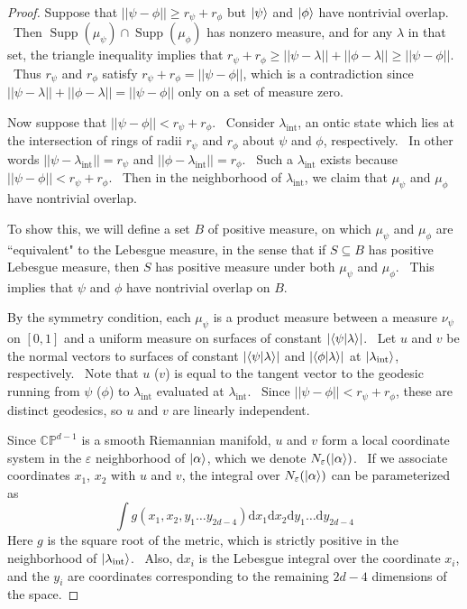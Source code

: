 \documentclass[letterpaper,11pt]{article}
\newcommand{\braket}[2]{\mbox{$ \langle #1 | #2 \rangle $}}
\newcommand{\ket}[1]{\mbox{$ | #1 \rangle $}}
\DeclareMathOperator{\supp}{Supp}
\begin{document}
\begin{proof}
Suppose that $||\psi-\phi||\geq r_{\psi}+r_{\phi}$ but $\ket{\psi}$ and $\ket{\phi}$ have nontrivial overlap. \ Then $\supp(\mu_{\psi})\cap \supp(\mu_{\phi})$ has nonzero measure, and for any $\lambda$ in that set, the triangle inequality implies that $r_{\psi}+r_{\phi}\geq ||\psi-\lambda||+||\phi-\lambda|| \geq ||\psi-\phi||$. \
Thus $r_{\psi}$ and $r_{\phi}$ satisfy $r_{\psi}+r_{\phi} = ||\psi-\phi||$, which is a contradiction since $||\psi-\lambda|| + ||\phi-\lambda|| = ||\psi-\phi||$ only on a set of measure zero. \

Now suppose that $||\psi-\phi||< r_{\psi}+r_{\phi}$. \ Consider $\lambda_{\mathrm{int}}$, an ontic state which lies at the intersection of rings of radii $r_{\psi}$ and $r_{\phi}$ about $\psi$ and $\phi$, respectively. \ In other words $||\psi-\lambda_{\mathrm{int}}|| =r_{\psi} $ and $||\phi-\lambda_{\mathrm{int}}|| =r_{\phi}$. \ Such a $\lambda_{\mathrm{int}}$ exists because $||\psi-\phi||< r_{\psi}+r_{\phi}$. \ Then in the neighborhood of $\lambda_{\mathrm{int}}$, we claim that $\mu_{\psi}$ and $\mu_{\phi}$ have nontrivial overlap.


To show this, we will define a set $B$ of positive measure, on which $\mu_{\psi}$ and $\mu_{\phi}$ are ``equivalent" to the Lebesgue measure, in the sense that if $S\subseteq B$ has positive Lebesgue measure, then $S$ has positive measure under both $\mu_{\psi}$ and $\mu_{\phi}$. \ This implies that $\psi$ and $\phi$ have nontrivial overlap on $B$.

By the symmetry condition, each $\mu_{\psi}$ is a product measure between a measure $\nu_{\psi}$ on $[0,1]$ and a uniform measure on surfaces of constant $|\braket{\psi}{\lambda}|$. \ Let $u$ and $v$ be the normal vectors to surfaces of constant $|\braket{\psi}{\lambda}|$ and $|\braket{\phi}{\lambda}|$ at $\ket{\lambda_{\mathrm{int}}}$, respectively. \ Note that $u$ ($v$) is equal to the tangent vector to the geodesic running from $\psi$ ($\phi$) to $\lambda_{\mathrm{int}}$ evaluated at $\lambda_{\mathrm{int}}$. \ Since $||\psi-\phi||< r_{\psi}+r_{\phi}$, these are distinct geodesics, so $u$ and $v$ are linearly independent.

Since $\mathbb{CP}^{d-1}$ is a smooth Riemannian manifold, $u$ and $v$ form a local coordinate system in the $\varepsilon$ neighborhood of $\ket{\alpha}$, which we denote $N_{\varepsilon}(\ket{\alpha})$. \ If we associate coordinates $x_1$, $x_2$ with $u$ and $v$, the integral over $N_{\varepsilon}(\ket{\alpha})$ can be parameterized as
\[
\int  g(x_1, x_2, y_1 \ldots y_{2d-4}) \mathrm{d} x_1 \mathrm{d}x_2 \mathrm{d}y_1 \ldots \mathrm{d}y_{2d-4}
\]
Here $g$ is the square root of the metric, which is strictly positive in the neighborhood of $\ket{\lambda_{\mathrm{int}}}$. \ Also, $\mathrm{d}x_i$ is the Lebesgue integral over the coordinate $x_i$, and the $y_i$ are coordinates corresponding to the remaining $2d-4$ dimensions of the space.


\end{proof}
\end{document}
